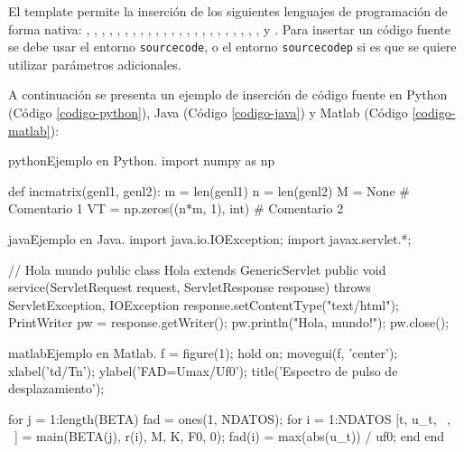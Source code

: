 		El template permite la inserción de los siguientes lenguajes de programación de forma nativa: , , , , , , , , , , , , , , , , , , , , , , ,  y . Para insertar un código fuente se debe usar el entorno \texttt{sourcecode}, o el entorno \texttt{sourcecodep} si es que se quiere utilizar parámetros adicionales. \newp

		A continuación se presenta un ejemplo de inserción de código fuente en Python (Código \ref{codigo-python}), Java (Código \ref{codigo-java}) y Matlab (Código \ref{codigo-matlab}):

\begin{sourcecode}[\label{codigo-python}]{python}{Ejemplo en Python.}
import numpy as np

def incmatrix(genl1, genl2):
	m = len(genl1)
	n = len(genl2)
	M = None # Comentario 1
	VT = np.zeros((n*m, 1), int) # Comentario 2
\end{sourcecode}

\begin{sourcecode}[\label{codigo-java}]{java}{Ejemplo en Java.}
import java.io.IOException;
import javax.servlet.*;

// Hola mundo
public class Hola extends GenericServlet {
	public void service(ServletRequest request, ServletResponse response)
	throws ServletException, IOException{
		response.setContentType("text/html");
		PrintWriter pw = response.getWriter();
		pw.println("Hola, mundo!");
		pw.close();
	}
}
\end{sourcecode}

\begin{sourcecode}[\label{codigo-matlab}]{matlab}{Ejemplo en Matlab.}
f = figure(1); hold on;
movegui(f, 'center');
xlabel('td/Tn'); ylabel('FAD=Umax/Uf0');
title('Espectro de pulso de desplazamiento');

for j = 1:length(BETA)
	fad = ones(1, NDATOS); %
	for i = 1:NDATOS
		[t, u_t, ~, ~] = main(BETA(j), r(i), M, K, F0, 0);
		fad(i) = max(abs(u_t)) / uf0;
	end
end
\end{sourcecode}

